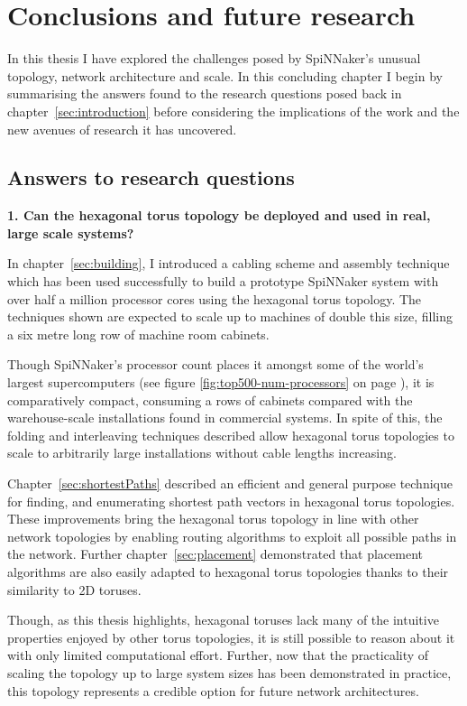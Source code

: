\chapter{Conclusions and future research}
	
	In this thesis I have explored the challenges posed by SpiNNaker's unusual
	topology, network architecture and scale. In this concluding chapter I begin
	by summarising the answers found to the research questions posed back in
	chapter~\ref{sec:introduction} before considering the implications of the
	work and the new avenues of research it has uncovered.
	
	\section{Answers to research questions}
		
		\textbf{1. Can the hexagonal torus topology be deployed and used in real,
		large scale systems?}
		
		In chapter~\ref{sec:building}, I introduced a cabling scheme and assembly
		technique which has been used successfully to build a prototype SpiNNaker
		system with over half a million processor cores using the hexagonal torus
		topology. The techniques shown are expected to scale up to machines of
		double this size, filling a six metre long row of machine room cabinets.
		
		Though SpiNNaker's processor count places it amongst some of the world's
		largest supercomputers (see figure \ref{fig:top500-num-processors} on page
		\pageref{fig:top500-num-processors}), it is comparatively compact,
		consuming a rows of cabinets compared with the warehouse-scale
		installations found in commercial systems. In spite of this, the folding
		and interleaving techniques described allow hexagonal torus topologies to
		scale to arbitrarily large installations without cable lengths increasing.
		
		Chapter~\ref{sec:shortestPaths} described an efficient and general purpose
		technique for finding, and enumerating shortest path vectors in hexagonal
		torus topologies. These improvements bring the hexagonal torus topology in
		line with other network topologies by enabling routing algorithms to
		exploit all possible paths in the network. Further
		chapter~\ref{sec:placement} demonstrated that placement algorithms are also
		easily adapted to hexagonal torus topologies thanks to their similarity to
		2D toruses.
		
		Though, as this thesis highlights, hexagonal toruses lack many of the
		intuitive properties enjoyed by other torus topologies, it is still
		possible to reason about it with only limited computational effort.
		Further, now that the practicality of scaling the topology up to large
		system sizes has been demonstrated in practice, this topology represents a
		credible option for future network architectures.
		
